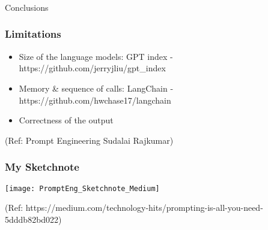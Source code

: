 \begin{frame}[fragile]\frametitle{}
\begin{center}
{\Large Conclusions}
\end{center}
\end{frame}

\begin{frame}[fragile]\frametitle{Limitations}


\begin{itemize}
\item  Size of the language models: GPT index - https://github.com/jerryjliu/gpt\_index
\item Memory \& sequence of calls: LangChain - https://github.com/hwchase17/langchain
\item Correctness of the output
\end{itemize}	 

		
		
{\tiny (Ref: Prompt Engineering Sudalai Rajkumar)}


\end{frame}

\begin{frame}[fragile]\frametitle{My Sketchnote}

\begin{center}
\texttt{[image: PromptEng\_Sketchnote\_Medium]}

{\tiny (Ref: https://medium.com/technology-hits/prompting-is-all-you-need-5dddb82bd022)}
\end{center}		


			

\end{frame}
